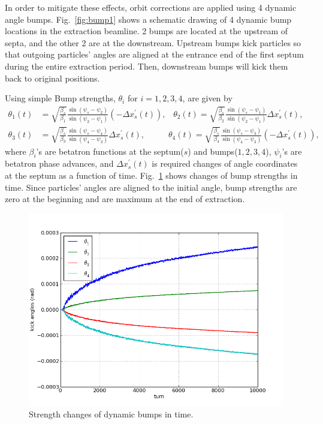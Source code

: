 \documentclass[aps,prstab,onecolumn,preprint,nofootinbib]{revtex4-1}
\begin{document}
In order to mitigate these effects, orbit corrections are applied using 4 dynamic angle bumps. Fig.~\ref{fig:bump1} shows a schematic drawing of 4 dynamic bump locations in the extraction beamline. 2 bumps are located at the upstream of septa, and the other 2 are at the downstream. Upstream bumps kick particles so that outgoing particles' angles are aligned at the entrance end of the first septum during the entire extraction period. Then, downstream bumps will kick them back to original positions.

Using simple Bump strengths, $\theta_{i}$ for $i=1,2,3,4$, are given by
\begin{equation}
  \begin{split}
  \theta_{1}(t) & = \sqrt{\frac{\beta_{s}}{\beta_{1}}}
               \frac{\sin(\psi_{s} - \psi_{2})}
                    {\sin(\psi_{2} - \psi_{1})}
               \left( - \Delta x_{s}^{\prime} (t) \right),
  \;\;\;
  \theta_{2}(t) = \sqrt{\frac{\beta_{s}}{\beta_{2}}}
               \frac{\sin(\psi_{s} - \psi_{1})}
                    {\sin(\psi_{2} - \psi_{1})}
               \Delta x_{s}^{\prime} (t), \\
  \theta_{3}(t) & = \sqrt{\frac{\beta_{s}}{\beta_{3}}}
               \frac{\sin(\psi_{s} - \psi_{4})}
                    {\sin(\psi_{4} - \psi_{3})}
               \Delta x_{s}^{\prime} (t),
  \;\;\;\;\;\;\;\;\;\;
  \theta_{4}(t) = \sqrt{\frac{\beta_{s}}{\beta_{4}}}
               \frac{\sin(\psi_{s} - \psi_{3})}
                    {\sin(\psi_{4} - \psi_{3})}
               \left( - \Delta x_{s}^{\prime} (t) \right),
  \end{split}
\end{equation}
where $\beta_{i}$'s are betatron functions at the septum($s$) and bumps($1,2,3,4$), $\psi_{i}$'s are betatron phase advances, and $\Delta x^{\prime}_{s} (t)$ is required changes of angle coordinates at the septum as a function of time. Fig.~\ref{fig:bump2} shows changes of bump strengths in time. Since particles' angles are aligned to the initial angle, bump strengths are zero at the beginning and are maximum at the end of extraction.

\begin{figure}[tbh!]
  \begin{center}
    \includegraphics[width=.45\textwidth]{img/20140123-00.png}
    \caption{\label{fig:bump2}Strength changes of dynamic bumps in time.}
  \end{center}
\end{figure}
\end{document}
